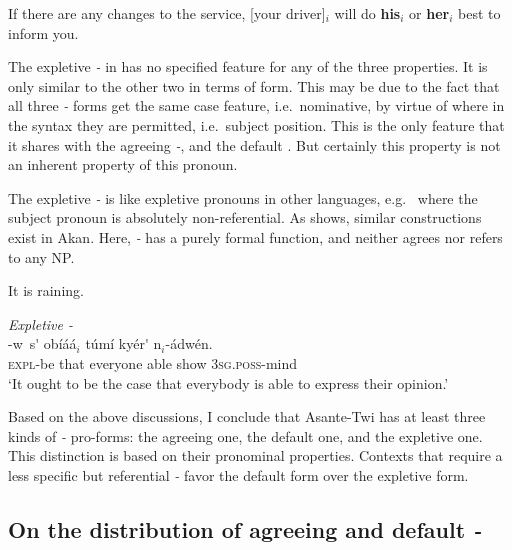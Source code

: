 \documentclass[output=paper]{LSP/langsci}
\begin{document}
\ex\label{ex:korsah:25b} 
If there are any changes to the service, [your driver]$_i$ will do \textbf{his}$_i$ or \textbf{her}$_i$ best to inform you.

\z
\z

 

 
The expletive \textit{\eer-} in  has no specified feature for any of the three properties. It is only similar to the other two in terms of form. This may be due to the fact that all three \textit{\eer-} forms get the same case feature, i.e.\ nominative, by virtue of where in the syntax they are permitted, i.e.\ subject position. This is the only feature that it shares with the agreeing \textit{\eer-}, and the default \textit{\eer}. But certainly this property is not an inherent property of this pronoun. 
 
 
The expletive \textit{\eer-} is like expletive pronouns in other languages, e.g.\  where the subject pronoun is absolutely non-referential. As  shows, similar constructions exist in Akan. Here, \textit{\eer-} has a purely formal function, and neither agrees nor refers to any NP.
 
 
 \ea\label{ex:korsah:26} 
 It is raining.

\z

 
\ea\label{ex:korsah:27} \textit{Expletive \eer-}\\
 
\gll \scalebox{1.5}{\eer}-w\oor \, s{\'{\eer}}  ob{\'{i}}{\'{a}}{\'{a}}$_i$ t{\'{u}}m{\'{i}} ky{\'{e}}r{\'{\eer}} n$_i$-{\'{a}}dw{\'{e}}n. \\
\textsc{expl}-be that everyone  able show \textsc{3sg.poss}-mind \hfill \\
\glt  `It ought to be the case that everybody is able to express their opinion.'

\z

 
Based on the above discussions, I conclude  that Asante-Twi has at least three kinds of \textit{\eer-} pro-forms: the agreeing one, the default one, and the expletive one. This distinction is based on their pronominal properties. Contexts that require a less specific but referential \textit{\eer-} favor the default form over the expletive form. 

 
\subsection{On the distribution of agreeing and default  \textit{\eer-} } \label{sec:korsah:4.2}
  
\end{document}
